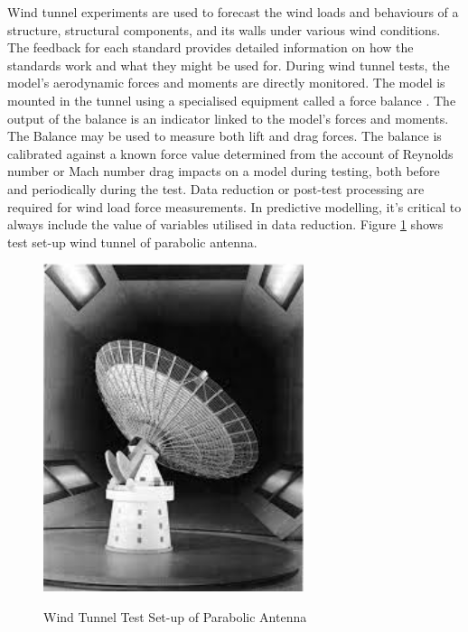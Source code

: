 {Wind tunnel experiments are used to forecast the wind loads and behaviours of a structure, structural components, and its walls under various wind conditions. The feedback for each standard provides detailed information on how the standards work and what they might be used for.
During wind tunnel tests, the model's aerodynamic forces and moments are directly monitored. The model is mounted in the tunnel using a specialised equipment called a force balance \cite{morris2010force}. The output of the balance is an indicator linked to the model's forces and moments. The Balance may be used to measure both lift and drag forces. The balance is calibrated against a known force value determined from the account of Reynolds number or Mach number drag impacts \cite{tienphuc2015numerical,gowen1953drag} on a model during testing, both before and periodically during the test. Data reduction or post-test processing are required for wind load force measurements. In predictive modelling, it's critical to always include the value of variables utilised in data reduction.
Figure \ref{fig:3.2} shows test set-up wind tunnel of parabolic antenna.

 
 
 \begin{figure}[htp]
     \centering
     \includegraphics[width=3in]{Figures/wind_tunnel_test.png}
     \caption{Wind Tunnel Test Set-up of Parabolic Antenna}
     \cite{wyatt1964aerodynamics}
     \label{fig:3.2}
 \end{figure}
 
 
 
 

}
